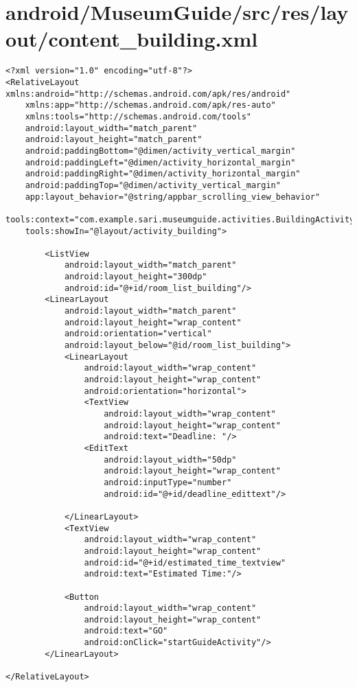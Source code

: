 \section{android/MuseumGuide/src/res/layout/content\_building.xml}
\begin{lstlisting}<?xml version="1.0" encoding="utf-8"?>
<RelativeLayout xmlns:android="http://schemas.android.com/apk/res/android"
    xmlns:app="http://schemas.android.com/apk/res-auto"
    xmlns:tools="http://schemas.android.com/tools"
    android:layout_width="match_parent"
    android:layout_height="match_parent"
    android:paddingBottom="@dimen/activity_vertical_margin"
    android:paddingLeft="@dimen/activity_horizontal_margin"
    android:paddingRight="@dimen/activity_horizontal_margin"
    android:paddingTop="@dimen/activity_vertical_margin"
    app:layout_behavior="@string/appbar_scrolling_view_behavior"
    tools:context="com.example.sari.museumguide.activities.BuildingActivity"
    tools:showIn="@layout/activity_building">

        <ListView
            android:layout_width="match_parent"
            android:layout_height="300dp"
            android:id="@+id/room_list_building"/>
        <LinearLayout
            android:layout_width="match_parent"
            android:layout_height="wrap_content"
            android:orientation="vertical"
            android:layout_below="@id/room_list_building">
            <LinearLayout
                android:layout_width="wrap_content"
                android:layout_height="wrap_content"
                android:orientation="horizontal">
                <TextView
                    android:layout_width="wrap_content"
                    android:layout_height="wrap_content"
                    android:text="Deadline: "/>
                <EditText
                    android:layout_width="50dp"
                    android:layout_height="wrap_content"
                    android:inputType="number"
                    android:id="@+id/deadline_edittext"/>

            </LinearLayout>
            <TextView
                android:layout_width="wrap_content"
                android:layout_height="wrap_content"
                android:id="@+id/estimated_time_textview"
                android:text="Estimated Time:"/>

            <Button
                android:layout_width="wrap_content"
                android:layout_height="wrap_content"
                android:text="GO"
                android:onClick="startGuideActivity"/>
        </LinearLayout>

</RelativeLayout>
\end{lstlisting}
\newpage
